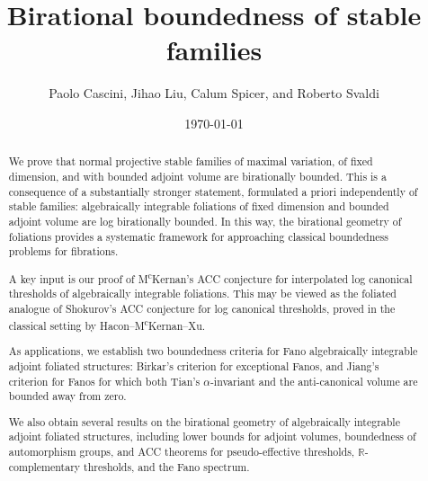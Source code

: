 \documentclass[11pt,reqno]{amsart}
\numberwithin{equation}{section}
\theoremstyle{definition}
\begin{document}
\title{Birational boundedness of stable families}
\author{Paolo Cascini, Jihao Liu, Calum Spicer, and Roberto Svaldi}

\date{\today}

\begin{abstract}
We prove that normal projective stable families of maximal variation, of fixed dimension, and with bounded adjoint volume are birationally bounded. This is a consequence of a substantially stronger statement, formulated a priori independently of stable families: algebraically integrable foliations of fixed dimension and bounded adjoint volume are log birationally bounded. In this way, the birational geometry of foliations provides a systematic framework for approaching classical boundedness problems for fibrations.

A key input is our proof of M\textsuperscript{c}Kernan's ACC conjecture for interpolated log canonical thresholds of algebraically integrable foliations. This may be viewed as the foliated analogue of Shokurov's ACC conjecture for log canonical thresholds, proved in the classical setting by Hacon--M\textsuperscript{c}Kernan--Xu.

As applications, we establish two boundedness criteria for Fano algebraically integrable adjoint foliated structures: Birkar's criterion for exceptional Fanos, and Jiang's criterion for Fanos for which both Tian's $\alpha$-invariant and the anti-canonical volume are bounded away from zero.

We also obtain several results on the birational geometry of algebraically integrable adjoint foliated structures, including lower bounds for adjoint volumes, boundedness of automorphism groups, and ACC theorems for pseudo-effective thresholds, $\mathbb{R}$-complementary thresholds, and the Fano spectrum.
\end{abstract}
\address{Department of Mathematics, Imperial College London, 180 Queen’s
Gate, London SW7 2AZ, UK}

\address{Department of Mathematics, Peking University, No. 5 Yiheyuan Road, Haidian District, Beijing 100871, China}
\address{Beijing International Center for Mathematical Research, Peking University, No. 5 Yiheyuan Road, Haidian District, Beijing 100871, China}
\end{document}
